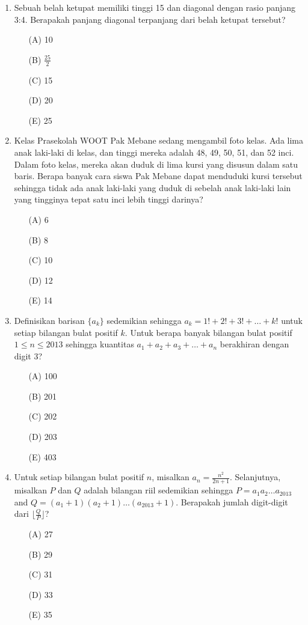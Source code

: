 \documentclass[10pt]{article}
\begin{document}
\begin{enumerate}
    \item Sebuah belah ketupat memiliki tinggi 15 dan diagonal dengan rasio panjang 3:4. Berapakah panjang diagonal terpanjang dari belah ketupat tersebut?
    \begin{itemize}
        \item[(A)] 10
        \item[(B)] $\frac{25}{2}$
        \item[(C)] 15
        \item[(D)] 20
        \item[(E)] 25
    \end{itemize}

    \item Kelas Prasekolah WOOT Pak Mebane sedang mengambil foto kelas. Ada lima anak laki-laki di kelas, dan tinggi mereka adalah 48, 49, 50, 51, dan 52 inci. Dalam foto kelas, mereka akan duduk di lima kursi yang disusun dalam satu baris. Berapa banyak cara siswa Pak Mebane dapat menduduki kursi tersebut sehingga tidak ada anak laki-laki yang duduk di sebelah anak laki-laki lain yang tingginya tepat satu inci lebih tinggi darinya?
    \begin{itemize}
        \item[(A)] 6
        \item[(B)] 8
        \item[(C)] 10
        \item[(D)] 12
        \item[(E)] 14
    \end{itemize}

    \item Definisikan barisan $\{a_{k}\}$ sedemikian sehingga $a_{k}=1!+2!+3!+\dots+k!$ untuk setiap bilangan bulat positif $k$. Untuk berapa banyak bilangan bulat positif $1\le n\le 2013$ sehingga kuantitas $a_{1}+a_{2}+a_{3}+\dots+a_{n}$ berakhiran dengan digit 3?
    \begin{itemize}
        \item[(A)] 100
        \item[(B)] 201
        \item[(C)] 202
        \item[(D)] 203
        \item[(E)] 403
    \end{itemize}

    \item Untuk setiap bilangan bulat positif $n$, misalkan $a_{n}=\frac{n^{2}}{2n+1}$. Selanjutnya, misalkan $P$ dan $Q$ adalah bilangan riil sedemikian sehingga $P=a_{1}a_{2}\dots a_{2013}$ and $Q=(a_{1}+1)(a_{2}+1)\dots(a_{2013}+1)$. Berapakah jumlah digit-digit dari $\lfloor\frac{Q}{P}\rfloor$?
    \begin{itemize}
        \item[(A)] 27
        \item[(B)] 29
        \item[(C)] 31
        \item[(D)] 33
        \item[(E)] 35
    \end{itemize}


\end{enumerate}
\end{document}
